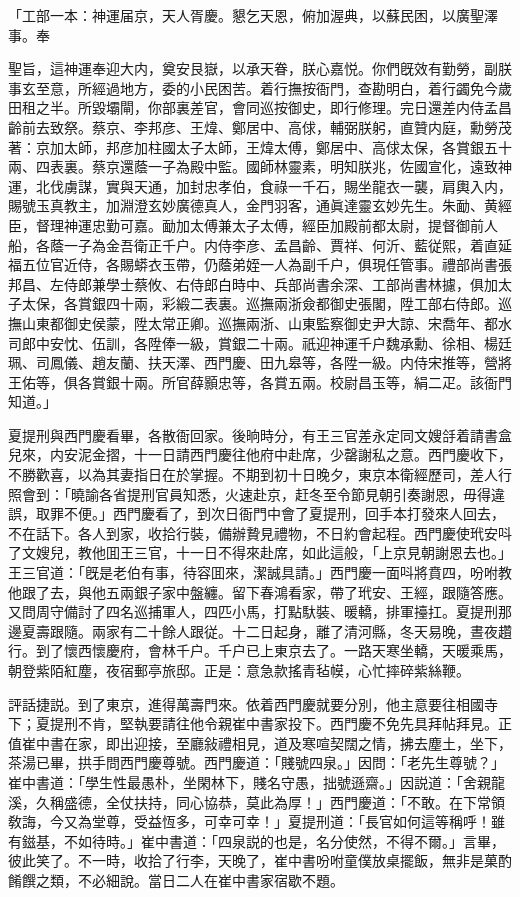 「工部一本：神運届京，天人胥慶。懇乞天恩，俯加渥典，以蘇民困，以廣聖澤事。奉

聖旨，這神運奉迎大内，奠安艮嶽，以承天眷，朕心嘉悦。你們旣效有勤勞，副朕事玄至意，所經過地方，委的小民困苦。着行撫按衙門，查勘明白，着行蠲免今歲田租之半。所毀壩閘，你部裏差官，會同巡按御史，即行修理。完日還差内侍孟昌齡前去致祭。蔡京、李邦彦、王煒、鄭居中、高俅，輔弼朕躬，直贊内庭，勳勞茂著：京加太師，邦彦加柱國太子太師，王煒太傅，鄭居中、高俅太保，各賞銀五十兩、四表裏。蔡京還蔭一子為殿中監。國師林靈素，明知朕兆，佐國宣化，遠致神運，北伐虜謀，實與天通，加封忠孝伯，食祿一千石，賜坐龍衣一襲，肩輿入内，賜號玉真教主，加淵澄玄妙廣德真人，金門羽客，通眞達靈玄妙先生。朱勔、黄經臣，督理神運忠勤可嘉。勔加太傅兼太子太傅，經臣加殿前都太尉，提督御前人船，各蔭一子為金吾衛正千户。内侍李彦、孟昌齡、賈祥、何沂、藍従熙，着直延福五位官近侍，各賜蟒衣玉帶，仍蔭弟姪一人為副千户，俱現任管事。禮部尚書張邦昌、左侍郎兼學士蔡攸、右侍郎白時中、兵部尚書余深、工部尚書林攄，俱加太子太保，各賞銀四十兩，彩緞二表裏。巡撫兩浙僉都御史張閣，陞工部右侍郎。巡撫山東都御史侯蒙，陞太常正卿。巡撫兩浙、山東監察御史尹大諒、宋喬年、都水司郎中安忱、伍訓，各陞俸一級，賞銀二十兩。祇迎神運千户魏承勳、徐相、楊廷珮、司鳳儀、趙友蘭、扶天澤、西門慶、田九皋等，各陞一級。内侍宋推等，營將王佑等，俱各賞銀十兩。所官薛顥忠等，各賞五兩。校尉昌玉等，絹二疋。該衙門知道。」

夏提刑與西門慶看畢，各散衙回家。後晌時分，有王三官差永定同文嫂㧱着請書盒兒來，内安泥金摺，十一日請西門慶往他府中赴席，少罄謝私之意。西門慶收下，不勝歡喜，以為其妻指日在於掌握。不期到初十日晚夕，東京本衛經歷司，差人行照會到：「曉諭各省提刑官員知悉，火速赴京，赶冬至令節見朝引奏謝恩，毋得違誤，取罪不便。」西門慶看了，到次日衙門中會了夏提刑，回手本打發來人回去，不在話下。各人到家，收拾行裝，備辦贄見禮物，不日約會起程。西門慶使玳安呌了文嫂兒，教他囬王三官，十一日不得來赴席，如此這般，「上京見朝謝恩去也。」王三官道：「旣是老伯有事，待容囬來，潔誠具請。」西門慶一面呌將賁四，吩咐教他跟了去，與他五兩銀子家中盤纏。留下春鴻看家，帶了玳安、王經，跟隨答應。又問周守備討了四名巡捕軍人，四匹小馬，打點馱裝、暖轎，排軍擡扛。夏提刑那邊夏壽跟隨。兩家有二十餘人跟従。十二日起身，離了清河縣，冬天易晚，晝夜趲行。到了懷西懷慶府，會林千户。千户已上東京去了。一路天寒坐轎，天暖乘馬，朝登紫陌紅塵，夜宿郵亭旅邸。正是：意急款搖青毡幙，心忙摔碎紫絲鞭。

評話捷説。到了東京，進得萬壽門來。依着西門慶就要分別，他主意要往相國寺下；夏提刑不肯，堅執要請往他令親崔中書家投下。西門慶不免先具拜帖拜見。正值崔中書在家，即出迎接，至廳敍禮相見，道及寒喧契闊之情，拂去塵土，坐下，茶湯已畢，拱手問西門慶尊號。西門慶道：「賤號四泉。」因問：「老先生尊號？」崔中書道：「學生性最愚朴，坐閑林下，賤名守愚，拙號遜齋。」因説道：「舍親龍溪，久稱盛德，全仗扶持，同心協恭，莫此為厚！」西門慶道：「不敢。在下常領敎誨，今又為堂尊，受益恆多，可幸可幸！」夏提刑道：「長官如何這等稱呼！雖有鎡基，不如待時。」崔中書道：「四泉説的也是，名分使然，不得不爾。」言畢，彼此笑了。不一時，收拾了行李，天晚了，崔中書吩咐童僕放桌擺飯，無非是菓酌餚饌之類，不必細說。當日二人在崔中書家宿歇不題。

